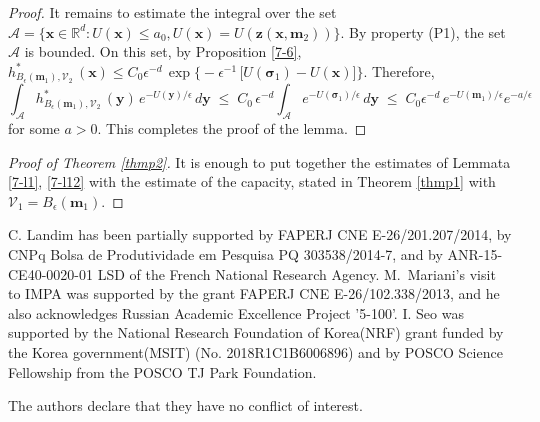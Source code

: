 \documentclass[reqno]{amsart}
\newcounter{as}[section]
\newcommand{\mc}[1]{{\mathcal #1}}
\newcommand{\bb}[1]{{\mathbb #1}}
\newcommand{\bs}[1]{{\boldsymbol #1}}
\newcommand{\<}{\langle}
\renewcommand{\>}{\rangle}
\begin{document}
\begin{proof}
It remains to estimate the integral over the set $\mc A = \{\bs
x\in\bb R^d : U(\bs x) \le a_0 , U(\bs x) = U(\bs z(\bs x , \bs m_2))\}$.
By property (P1), the set $\mc A$ is bounded.  On this set, by
Proposition \ref{7-6}, $h^*_{B_\epsilon(\bs m_1), \mc V_2} \, (\bs x)
\le C_0 \epsilon^{-d}\, \exp \big\{- \epsilon^{-1}\, \big[ U(\bs
\sigma_1) - U(\bs x) \big] \big\}$. Therefore,
\begin{equation*}
\int_{\mc A} h^*_{B_\epsilon(\bs m_1), \mc V_2} \, (\bs y) \,
e^{-U(\bs y)/\epsilon}\, d\bs y \;\le \;
C_0  \, \epsilon^{-d}
\int_{\mc A} e^{-U(\bs \sigma_1)/\epsilon}\, d\bs y
\;\le\; C_0\epsilon^{-d}\, e^{-U(\bs m_1)/\epsilon} e^{-a/\epsilon}
\end{equation*}
for some $a>0$. This completes the proof of the lemma.
\end{proof}

\begin{proof}[Proof of Theorem \ref{thmp2}]
It is enough to put together the estimates of Lemmata \ref{7-l1},
\ref{7-l12} with the estimate of the capacity, stated in Theorem
\ref{thmp1} with $\mc V_1 = B_\epsilon(\bs m_1)$.
\end{proof}

\smallskip{} C. Landim has been partially
supported by FAPERJ CNE E-26/201.207/2014, by CNPq Bolsa de
Produtividade em Pesquisa PQ 303538/2014-7, and by ANR-15-CE40-0020-01
LSD of the French National Research Agency.  M.\ Mariani's visit to IMPA was supported by the grant FAPERJ CNE E-26/102.338/2013, and he also acknowledges Russian Academic Excellence Project ’5-100'. I. Seo was supported by the National Research Foundation of Korea(NRF) grant funded by the Korea government(MSIT) (No. 2018R1C1B6006896) and by POSCO Science Fellowship from the POSCO TJ Park Foundation.

\smallskip{} The authors declare
that they have no conflict of interest.
\end{document}
